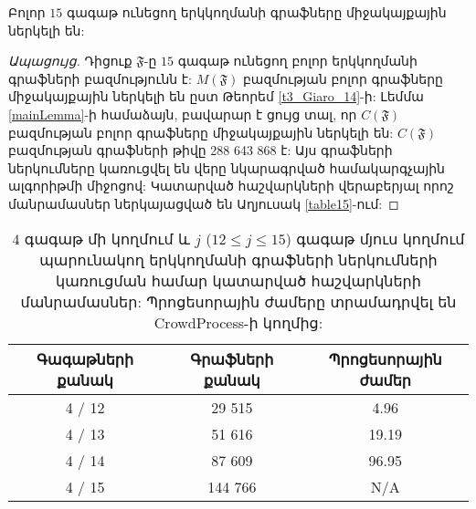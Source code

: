 \begin{theorem}
\label{th15}
Բոլոր $15$ գագաթ ունեցող երկկողմանի գրաֆները միջակայքային ներկելի են:
\end{theorem}
\begin{proof}[Ապացույց]
Դիցուք $\mathfrak{F}$-ը $15$ գագաթ ունեցող բոլոր երկկողմանի գրաֆների բազմությունն է: $M(\mathfrak{F})$ բազմության բոլոր գրաֆները միջակայքային ներկելի են ըստ Թեորեմ \ref{t3_Giaro_14}-ի: Լեմմա \ref{mainLemma}-ի համաձայն, բավարար է ցույց տալ, որ $C(\mathfrak{F})$ բազմության բոլոր գրաֆները միջակայքային ներկելի են: $C(\mathfrak{F})$ բազմության գրաֆների թիվը 288 643 868 է: Այս գրաֆների ներկումները կառուցվել են վերը նկարագրված համակարգչային ալգորիթմի միջոցով: Կատարված հաշվարկների վերաբերյալ որոշ մանրամասներ ներկայացված են Աղյուսակ \ref{table15}-ում:
\end{proof}
\begin{table}[t]
\renewcommand{\arraystretch}{1.2}
\begin{center}
\begin{tabular}{|c|c|c|}
\hline
Գագաթների քանակ & Գրաֆների քանակ & Պրոցեսորային ժամեր \\
\hline
4 / 12 & 29 515 & 4.96 \\
\hline
4 / 13 & 51 616 & 19.19 \\
\hline
4 / 14 & 87 609 & 96.95\\
\hline
4 / 15 & 144 766 & N/A \\
\hline
\end{tabular}
\end{center}
\caption{$4$ գագաթ մի կողմում և $j$ ($12 \leq j \leq 15$) գագաթ մյուս կողմում պարունակող երկկողմանի գրաֆների ներկումների կառուցման համար կատարված հաշվարկների մանրամասներ: Պրոցեսորային ժամերը տրամադրվել են CrowdProcess-ի կողմից:}\label{table4x}
\end{table}

